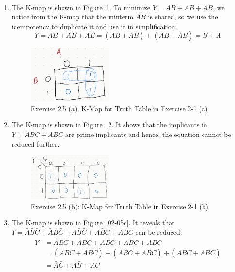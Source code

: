 \documentclass[12pt]{article}
\newenvironment{sol}[1][Solution]{\begin{trivlist}
		\item[\hskip \labelsep {\bfseries #1:}]}{\end{trivlist}}
\begin{document}
\begin{sol}\
	
	\begin{enumerate}[label=(\alph*)]
		\item The K-map is shown in Figure~\ref{02-05a}. To minimize $Y=\bar{A}\bar{B}+A\bar{B}+AB$, we notice from the K-map that the minterm $A\bar{B}$ is shared, so we use the idempotency to duplicate it and use it in simplification:
		\[
		Y=\bar{A}\bar{B}+A\bar{B}+AB=(\bar{A}\bar{B}+A\bar{B})+(A\bar{B}+AB)=\bar{B}+A
		\]
		\begin{figure}
			\centering
			\includegraphics[width=0.4\textwidth]{02-05a-k-map}
			\caption{Exercise 2.5 (a): K-Map for Truth Table in Exercise 2-1 (a)}
			\label{02-05a}
		\end{figure}
		\item The K-map is shown in Figure ~\ref{02-05b}. It shows that the implicants in $Y=\bar{A}\bar{B}\bar{C}+ABC$ are prime implicants and hence, the equation cannot be reduced further.
		\begin{figure}
			\centering
			\includegraphics[width=0.4\textwidth]{02-05b-k-map}
			\caption{Exercise 2.5 (b): K-Map for Truth Table in Exercise 2-1 (b)}
			\label{02-05b}
		\end{figure}
		\item The K-map is shown in Figure~\ref{02-05c}. It reveals that
		$Y=\bar{A}\bar{B}\bar{C}+\bar{A}B\bar{C}+A\bar{B}\bar{C}+A\bar{B}C+ABC$ can be reduced:
		\begin{align}
			Y&=\bar{A}\bar{B}\bar{C}+\bar{A}B\bar{C}+A\bar{B}\bar{C}+A\bar{B}C+ABC\nonumber\\
			&=(\bar{A}\bar{B}\bar{C}+\bar{A}B\bar{C})+(A\bar{B}\bar{C}+A\bar{B}C)+(A\bar{B}C+ABC)\nonumber\\
			&=\bar{A}\bar{C}+A\bar{B}+AC\nonumber
		\end{align}

\end{enumerate}
\end{sol}
\end{document}
